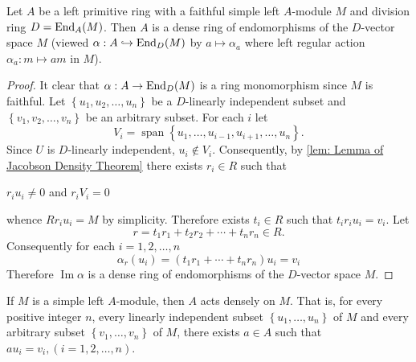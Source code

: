 \begin{theorem}
    \label{thm: Jacobson Density Theorem}
    Let $A$ be a left primitive ring with a faithful simple left $A$-module $M$ and division ring $D=\operatorname{\operatorname{End}}_{A}(M)$.
    Then $A$ is a dense ring of endomorphisms of the $D$-vector space $M$ (viewed $\alpha :A \hookrightarrow \operatorname{\operatorname{End}}_D(M)$ by $ a\mapsto \alpha_a$ where left regular action $\alpha_a: m\mapsto am$ in $M$).
    \begin{proof}
        It clear that $\alpha: A \rightarrow \operatorname{\operatorname{End}}_D(M)$ is a ring monomorphism since $M$ is faithful.
        Let $\left\{u_1, u_2, \ldots, u_n\right\}$ be a $D$-linearly independent subset and $\left\{v_1, v_2, \ldots, v_n\right\}$ be an arbitrary subset.
        For each $i$ let
        \begin{equation*}
            V_i
            =
            \operatorname{span}\left\{u_1, \ldots, u_{i-1}, u_{i+1}, \ldots, u_n\right\}.
        \end{equation*}
        Since $U$ is $D$-linearly independent, $u_i \notin V_i$. Consequently, by \ref{lem: Lemma of Jacobson Density Theorem} there exists $r_i \in R$ such that
        \begin{center}
            $r_i u_i \neq 0$ and $r_i V_i=0$
        \end{center}
        whence $R r_i u_i=M$ by simplicity. Therefore exists $t_i \in R$ such that $t_i r_i u_i=v_i$. Let
        \begin{equation*}
            r=t_1 r_1+t_2 r_2+\cdots+t_n r_n \in R .
        \end{equation*}
        Consequently for each $i=1,2, \ldots, n$
        \begin{equation*}
            \alpha_r\left(u_i\right)=\left(t_1 r_1+\cdots+t_n r_n\right) u_i
            =
            v_i
        \end{equation*}
        Therefore $\operatorname{Im} \alpha$ is a dense ring of endomorphisms of the $D$-vector space $M$.
    \end{proof}
\end{theorem}


\begin{corollary}
    If $M$ is a simple left $A$-module, then $A$ acts densely on $M$.
    That is, for every positive integer $n$, every linearly independent subset $\left\{u_1, \ldots, u_n\right\}$ of $M$ and every arbitrary subset $\left\{v_1, \ldots, v_n\right\}$ of $M$, there exists $a \in A$ such that $a u_i=v_i, (i=1,2, \ldots, n)$.
\end{corollary}



